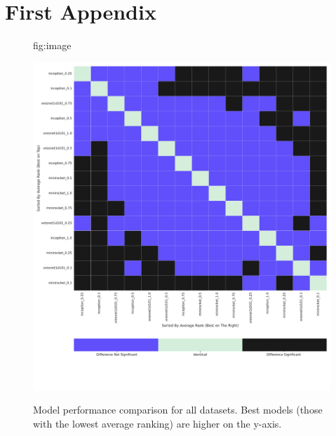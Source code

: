 \documentclass[pmlr,twocolumn]{jmlr}%
\begin{document}


\appendix
\section{First Appendix}\label{apd:model_vs_model}
\begin{figure}[tbp]
\floatconts
  {fig:image}
  {\caption{Model performance comparison for all datasets. Best models (those with the lowest average ranking) are higher on the y-axis.}}
  {\includegraphics[width=1\linewidth]{images/model_comparisons_alldatasets.pdf}}
 
\end{figure}
\end{document}
